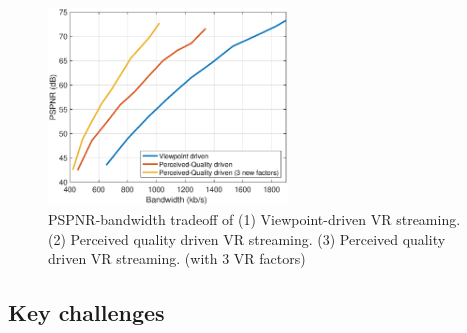 %
%
%
%


\begin{figure}
  \centering
  \includegraphics[width=2.5in]{images/improvement.eps}
  \caption{PSPNR-bandwidth tradeoff of (1) Viewpoint-driven VR streaming. (2) Perceived quality driven VR streaming. (3) Perceived quality driven VR streaming. (with 3 VR factors)}
  \label{fig:potential}
  \end{figure}




\subsection{Key challenges}

